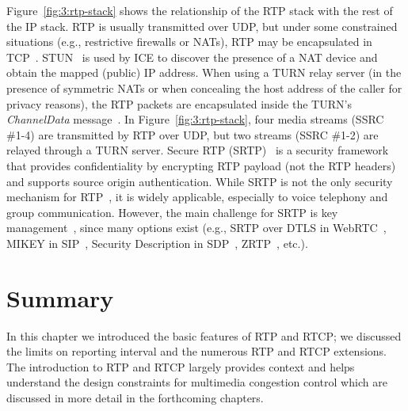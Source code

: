 Figure~\ref{fig:3:rtp-stack} shows the relationship of the RTP stack with the
rest of the IP stack. RTP is usually transmitted over UDP, but under some
constrained situations (e.g., restrictive firewalls or NATs), RTP may be
encapsulated in TCP~\cite{rfc3550}. STUN~\cite{rfc5389} is used by ICE to
discover the presence of a NAT device and obtain the mapped (public) IP
address. When using a TURN relay server (in the presence of symmetric NATs or
when concealing the host address of the caller for privacy reasons), the RTP
packets are encapsulated inside the TURN's \emph{ChannelData}
message~\cite{rfc5766}. In Figure~\ref{fig:3:rtp-stack}, four media streams
(SSRC \#1-4) are transmitted by RTP over UDP, but two streams (SSRC \#1-2) are
relayed through a TURN server. Secure RTP (SRTP)~\cite{rfc3611} is a security
framework that provides confidentiality by encrypting RTP payload (not the RTP
headers) and supports source origin authentication. While SRTP is not the only
security mechanism for RTP~\cite{rfc7202}, it is widely
applicable, especially to voice telephony and group communication. However,
the main challenge for SRTP is key management~\cite{rfc7201}, since
many options exist (e.g., SRTP over DTLS in WebRTC~\cite{rfc5763}, MIKEY in
SIP~\cite{rfc3830}, Security Description in SDP~\cite{rfc4566},
ZRTP~\cite{rfc6189}, etc.).

\section{Summary}

In this chapter we introduced the basic features of RTP and RTCP; we discussed
the limits on reporting interval and the numerous RTP and RTCP extensions.
The introduction to RTP and RTCP largely provides context and helps understand
the design constraints  for multimedia congestion control which are discussed 
in more detail in the forthcoming chapters.
